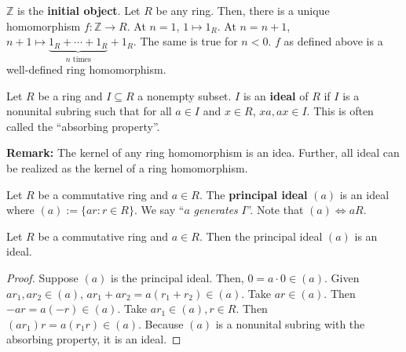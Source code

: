 \documentclass [12pt] {article}
\newcommand{\Z}{\mathbb{Z}}
\newenvironment{definition}[1]{\begin{tcolorbox}[title={Definition: #1},colback=blue!5!white,colframe=black!75!blue]}{\end{tcolorbox}}
\newenvironment{theorem}[1]{\begin{tcolorbox}[title={Theorem #1},colback=green!5!white,colframe=black!75!green]}{\end{tcolorbox}}
\renewcommand{\it}[1]{\textit{{#1}}}
\renewcommand{\bf}[1]{\textbf{{#1}}}
\begin{document}
\begin{definition}{Initial Object}
    $\Z$ is the \bf{initial object}. Let $R$ be any ring. Then, there is a unique homomorphism 
    $f : \Z \to R$. At $n = 1$, $1 \mapsto 1_R$. At $n = n + 1$, 
    $n + 1 \mapsto \underbrace{1_R + \cdots + 1_R}_{n \text{ times}} + 1_R$. The same is true for 
    $n < 0$. $f$ as defined above is a well-defined ring homomorphism.
\end{definition}

\begin{definition}{Ideal}
    Let $R$ be a ring and $I \subseteq R$ a nonempty subset. $I$ is an \bf{ideal} of $R$ if $I$ is
    a nonunital subring such that for all $a \in I$ and $x \in R$, $xa, ax \in I$. This is often 
    called the ``absorbing property''.
\end{definition}
\bf{Remark:} The kernel of any ring homomorphism is an idea. Further, all ideal can be realized as
the kernel of a ring homomorphism.

\begin{definition}{Principal Ideal}
    Let $R$ be a commutative ring and $a \in R$. The \bf{principal ideal} $(a)$ is an ideal where
    $(a) := \{ ar : r \in R \}$. We say ``$a$ \it{generates} $I$''. Note that $(a) \iff aR$.
\end{definition}

\begin{theorem}{}
    Let $R$ be a commutative ring and $a \in R$. Then the principal ideal $(a)$ is an ideal.
\end{theorem}
\begin{proof}
    Suppose $(a)$ is the principal ideal. Then, $0 = a \cdot 0 \in (a)$. Given $ar_1, ar_2 \in (a)$, 
    $ar_1 + ar_2 = a(r_1 + r_2) \in (a)$. Take $ar \in (a)$. Then $-ar = a(-r) \in (a)$. Take
    $ar_1 \in (a), r \in R$. Then $(ar_1) r = a(r_1 r) \in (a)$. Because $(a)$ is a nonunital subring
    with the absorbing property, it is an ideal.
\end{proof}
\end{document}
